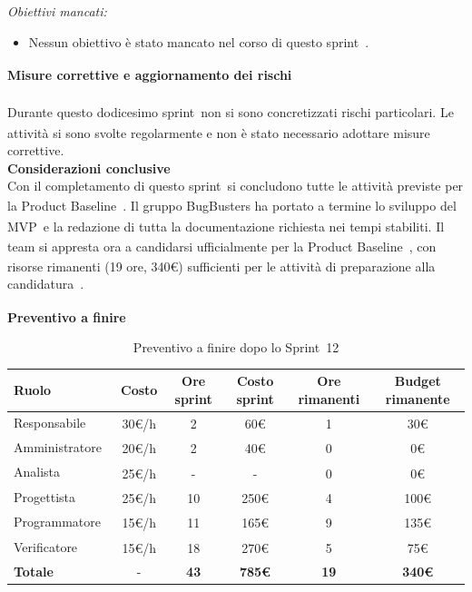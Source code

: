 \documentclass[a4paper,12pt]{article}
\newcommand{\pediceG}{\texorpdfstring{\textsubscript{\scalebox{0.6}{\textbf{G}}}~}{G}}
\begin{document}
\textit{Obiettivi mancati:}
\begin{itemize}
    \item Nessun obiettivo è stato mancato nel corso di questo sprint\pediceG.
\end{itemize}
 
\noindent\textbf{Misure correttive e aggiornamento dei rischi\pediceG}\\\\
Durante questo dodicesimo sprint\pediceG non si sono concretizzati rischi particolari. Le attività si sono svolte regolarmente e non è stato necessario adottare misure correttive.\\
 
\noindent\textbf{Considerazioni conclusive}\\
Con il completamento di questo sprint\pediceG si concludono tutte le attività previste per la Product Baseline\pediceG. Il gruppo BugBusters ha portato a termine lo sviluppo del MVP\pediceG e la redazione di tutta la documentazione richiesta nei tempi stabiliti. Il team si appresta ora a candidarsi ufficialmente per la Product Baseline\pediceG, con risorse rimanenti (19 ore, 340€) sufficienti per le attività di preparazione alla candidatura\pediceG.

\vspace{0.4cm}
\noindent\textbf{Preventivo a finire}
 
\begin{table}[H]
\centering
\footnotesize
\begin{tabular}{|l|c|c|c|c|c|}
\hline
Ruolo & Costo & Ore sprint & Costo sprint & Ore rimanenti & Budget rimanente \\
\hline
Responsabile\pediceG & 30€/h & 2 & 60€ & 1 & 30€ \\
\hline
Amministratore\pediceG & 20€/h & 2 & 40€ & 0 & 0€ \\
\hline
Analista\pediceG & 25€/h & - & - & 0 & 0€ \\
\hline
Progettista\pediceG & 25€/h & 10 & 250€ & 4 & 100€ \\
\hline
Programmatore\pediceG & 15€/h & 11 & 165€ & 9 & 135€ \\
\hline
Verificatore\pediceG & 15€/h & 18 & 270€ & 5 & 75€ \\
\hline
\textbf{Totale} & - & \textbf{43} & \textbf{785€} & \textbf{19} & \textbf{340€} \\
\hline
\end{tabular}
\caption{Preventivo a finire dopo lo Sprint\pediceG 12}
\label{tab:risorse-sprint12}
\end{table}
 
\end{document}
